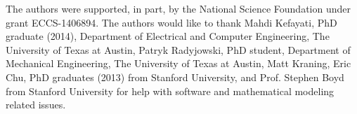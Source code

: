 \documentclass[preprint,12pt,3p]{elsarticle}
\begin{document}
	\noindent The authors were supported, in part, by the National Science Foundation
	under grant ECCS-1406894. The authors would like to thank Mahdi Kefayati, PhD graduate (2014), Department of Electrical and Computer Engineering, The University of Texas at Austin, Patryk Radyjowski, PhD student, Department of Mechanical Engineering, The University of Texas at Austin, Matt Kraning, Eric Chu, PhD graduates (2013) from Stanford University, and Prof. Stephen Boyd from Stanford University for help with software and mathematical modeling related issues.
	
	
	
	
	
	
	
	
\end{document}
